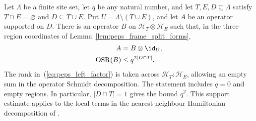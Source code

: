 \begin{lemma}
    \label{thm:peps_supported_left_factor_rank}
    \leanok
    Let $\Lambda$ be a finite site set, let $q$ be any natural number, and
    let $T,E,D\subseteq\Lambda$ satisfy $T\cap E=\varnothing$ and
    $D\subseteq T\cup E$. Put $U=\Lambda\setminus(T\cup E)$, and let
    $A$ be an operator supported on $D$. There is an operator $B$ on
    $\mathcal H_T\otimes\mathcal H_E$ such that, in the three-region
    coordinates of Lemma~\ref{lem:peps_frame_split_forms},
    \begin{align}
        A                     & = B\otimes\id_U,\notag                         \\
        \operatorname{OSR}(B) & \le q^{2|D\cap T|}.\label{eq:peps_left_factor}
    \end{align}
    The rank in~(\ref{eq:peps_left_factor}) is taken across $\mathcal H_T:\mathcal H_E$, allowing an empty
    sum in the operator Schmidt decomposition. The statement includes
    $q=0$ and empty regions. In particular, $|D\cap T|=1$ gives the bound
    $q^2$. This support estimate applies to the local terms in the
    nearest-neighbour Hamiltonian decomposition of
    \cite[Section~4.1]{Arad2016RigorousRG}.
\end{lemma}
